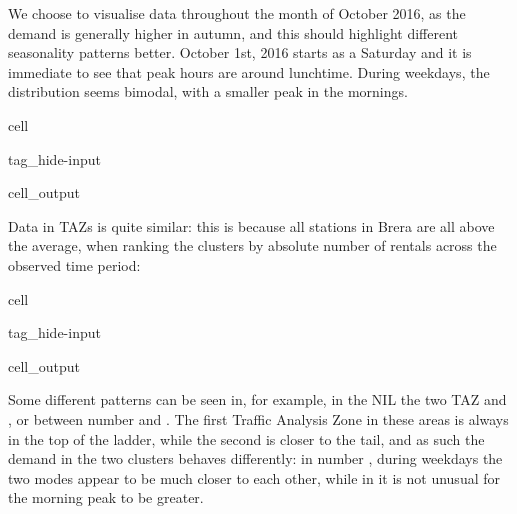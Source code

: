 \documentclass[letterpaper,10pt,english]{jupyterBook}
\begin{document}
\sphinxAtStartPar
We choose to visualise data throughout the month of October 2016, as the demand is generally higher in autumn, and this should highlight different seasonality patterns better. October 1st, 2016 starts as a Saturday and it is immediate to see that peak hours are around lunchtime. During weekdays, the distribution seems bimodal, with a smaller peak in the mornings.

\begin{sphinxuseclass}{cell}
\begin{sphinxuseclass}{tag_hide-input}
\begin{sphinxuseclass}{cell_output}
\noindent{}

\noindent{}

\end{sphinxuseclass}
\end{sphinxuseclass}
\end{sphinxuseclass}
\sphinxAtStartPar
Data in  TAZs is quite similar: this is because all stations in Brera are all above the average, when ranking the clusters by absolute number of rentals across the observed time period:

\begin{sphinxuseclass}{cell}
\begin{sphinxuseclass}{tag_hide-input}
\begin{sphinxuseclass}{cell_output}
\noindent{}

\end{sphinxuseclass}
\end{sphinxuseclass}
\end{sphinxuseclass}
\sphinxAtStartPar
Some different patterns can be seen in, for example, in the NIL  the two TAZ  and , or between  number  and . The first Traffic Analysis Zone in these areas is always in the top of the ladder, while the second is closer to the tail, and as such the demand in the two clusters behaves differently: in number , during weekdays the two modes appear to be much closer to each other, while in  it is not unusual for the morning peak to be greater.
\end{document}
